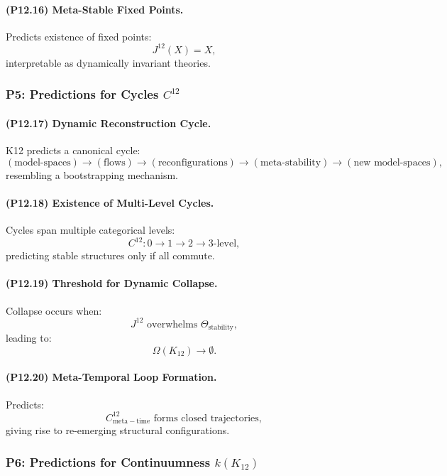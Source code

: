 \paragraph{(P12.16) Meta-Stable Fixed Points.}
Predicts existence of fixed points:
\[
J^{12}(X) = X,
\]
interpretable as dynamically invariant theories.

\subsubsection{P5: Predictions for Cycles $C^{12}$}

\paragraph{(P12.17) Dynamic Reconstruction Cycle.}
K12 predicts a canonical cycle:
\[
(\text{model-spaces}) \to
(\text{flows}) \to
(\text{reconfigurations}) \to
(\text{meta-stability}) \to
(\text{new model-spaces}),
\]
resembling a bootstrapping mechanism.

\paragraph{(P12.18) Existence of Multi-Level Cycles.}
Cycles span multiple categorical levels:
\[
C^{12}: 0 \to 1 \to 2 \to 3\text{-level},
\]
predicting stable structures only if all commute.

\paragraph{(P12.19) Threshold for Dynamic Collapse.}
Collapse occurs when:
\[
J^{12} \text{ overwhelms } \Theta_{\mathrm{stability}},
\]
leading to:
\[
\Omega(K_{12}) \to \emptyset.
\]

\paragraph{(P12.20) Meta-Temporal Loop Formation.}
Predicts:
\[
C_{\mathrm{meta-time}}^{12}
\text{ forms closed trajectories},
\]
giving rise to re-emerging structural configurations.

\subsubsection{P6: Predictions for Continuumness $k(K_{12})$}

